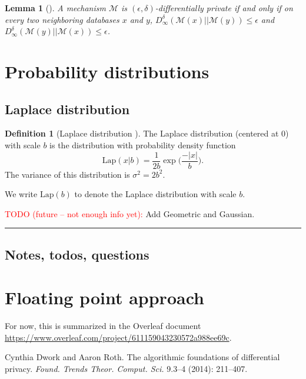 \documentclass[11pt,a4paper]{article}
\newtheorem{lemma}[theorem]{Lemma}
\theoremstyle{definition}
\newtheorem{definition}[theorem]{Definition}
\newcommand{\horizline}{\noindent\rule{\textwidth}{1pt}}
\newcommand{\Lap}{\mathrm{Lap}}
\newcommand{\M}{\mathcal{M}}
\newcommand{\todonei}{{\textcolor{red}{TODO (future -- not enough info yet): }}}
\newcommand{\silvia}[1]{{ {\color{blue}{(silvia)~#1}}}}
\begin{document}
\begin{lemma}[\cite{dr14}]
    A mechanism $\M$ is $(\epsilon, \delta)$-differentially private if and only if on every two neighboring databases $x$ and $y$, $D_{\infty}^{\delta}(\M(x)||\M(y)) \leq \epsilon$ and $D_{\infty}^{\delta}(\M(y)||\M(x)) \leq \epsilon$.
\end{lemma}


\section{Probability distributions}
\subsection{Laplace distribution}
\begin{definition}[Laplace distribution \cite{dr14}]
    The Laplace distribution (centered at 0) with scale $b$ is the distribution with probability density function
    \[
        \Lap(x|b) = \dfrac{1}{2b} \exp \Big(\dfrac{-|x|}{b}\Big).
    \]
    The variance of this distribution is $\sigma^2 = 2b^2$. \silvia{Add cumulative def.? Probably not necessary. Discuss anything else we would like to add.}
\end{definition}
We write $\Lap(b)$ to denote the Laplace distribution with scale $b$.

\todonei{Add Geometric and Gaussian.}

\horizline

\subsection{Notes, todos, questions}

\section{Floating point approach}
For now, this is summarized in the Overleaf document \url{https://www.overleaf.com/project/611159043230572a988ee69c}.

\begin{thebibliography}{99}

Cynthia Dwork and Aaron Roth. The algorithmic foundations of differential privacy. \textit{Found. Trends Theor. Comput. Sci.} 9.3--4 (2014): 211--407.


\end{thebibliography}
\end{document}
